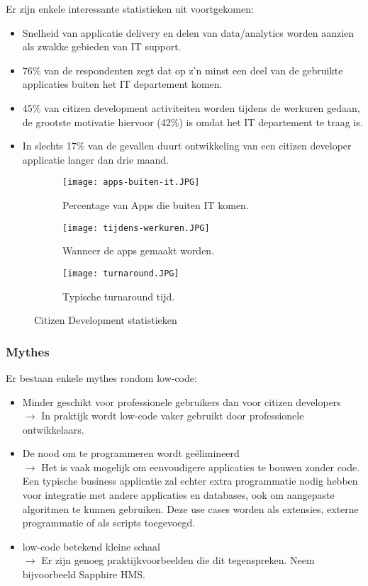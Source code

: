 Er zijn enkele interessante statistieken uit voortgekomen:
\begin{itemize}
    \item Snelheid van applicatie delivery en delen van data/analytics worden aanzien als zwakke gebieden van IT support.
    \item 76\% van de respondenten zegt dat op z'n minst een deel van de gebruikte applicaties buiten het IT departement komen.
    \item 45\% van citizen development activiteiten worden tijdens de werkuren gedaan, de grootste motivatie hiervoor (42\%) is omdat het IT departement te traag is.
    \item In slechts 17\% van de gevallen duurt ontwikkeling van een citizen developer applicatie langer dan drie maand.
\end{itemize}

\begin{figure}[h!]
    \centering
    \begin{subfigure}[b]{0.4\linewidth}
        \texttt{[image: apps-buiten-it.JPG]}
        \caption{Percentage van Apps die buiten IT komen.}
    \end{subfigure}
    \begin{subfigure}[b]{0.45\linewidth}
        \texttt{[image: tijdens-werkuren.JPG]}
        \caption{Wanneer de apps gemaakt worden.}
    \end{subfigure}
    \begin{subfigure}[b]{0.45\linewidth}
    \texttt{[image: turnaround.JPG]}
    \caption{Typische turnaround tijd.}
    \end{subfigure}
    \caption{Citizen Development statistieken \autocite{McKendrick2017}}
    \label{fig:test2cols}
\end{figure}

\subsubsection{Mythes}

Er bestaan enkele mythes rondom low-code:
\begin{itemize}
    \item Minder geschikt voor professionele gebruikers dan voor citizen developers \\
    $\rightarrow$ In praktijk wordt low-code vaker gebruikt door professionele ontwikkelaars.
    \item De nood om te programmeren wordt geëlimineerd \\
    $\rightarrow$ Het is vaak mogelijk om eenvoudigere applicaties te bouwen zonder code. Een typische business applicatie zal echter extra programmatie nodig hebben voor integratie met andere applicaties en databases, ook om aangepaste algoritmen te kunnen gebruiken. Deze use cases worden als extensies, externe programmatie of als scripts toegevoegd.
    \item low-code betekend kleine schaal \\
    $\rightarrow$ Er zijn genoeg praktijkvoorbeelden die dit tegenspreken. Neem bijvoorbeeld Sapphire HMS. \autocite{Bashar2017}
\end{itemize} \autocite{Richardson2016}

